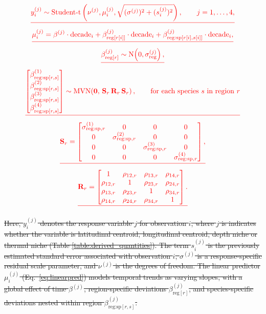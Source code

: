 \documentclass[9pt,twocolumn,twoside]{pnas-new}
\providecommand{\DIFdel}[1]{{\protect\color{red}\sout{#1}}} %
\begin{document}
{%
\begin{gather*}
\DIFdel{y_{i}^{(j)} \sim \operatorname{Student\text{-}t}
\left(\nu^{(j)}, 
\mu_{i}^{(j)}, 
\sqrt{(\sigma^{(j)})^{2} + (s^{(j)}_{i})^{2}}
\right),
\qquad j=1,\dots,4, 
}\\
\DIFdel{\mu_{i}^{(j)} =
\beta^{(j)} \cdot \text{decade}_{i}
+ \beta_{\text{reg}[r[i]]}^{(j)} \cdot \text{decade}_{i}
+ \beta_{\text{reg:sp}[r[i],s[i]]}^{(j)} \cdot \text{decade}_{i}%
,
}\\
\DIFdel{\beta_{\text{reg}[r]}^{(j)} \sim 
\operatorname{N}\!\left(0,\sigma_{\text{reg}}^{(j)}\right),
}\\
\DIFdel{\begin{bmatrix}
\beta_{\text{reg:sp}[r,s]}^{(1)} \\
\beta_{\text{reg:sp}[r,s]}^{(2)} \\
\beta_{\text{reg:sp}[r,s]}^{(3)} \\
\beta_{\text{reg:sp}[r,s]}^{(4)}
\end{bmatrix}
\sim 
\operatorname{MVN}\!\left(
\mathbf{0},\,
\mathbf{S}_{r}\,\mathbf{R}_{r}\,\mathbf{S}_{r}
\right),
\qquad \text{for each species}~s~\text{in region}~r
}\\
\DIFdel{\mathbf{S}_{r} =
\begin{bmatrix}
\sigma^{(1)}_{\text{reg:sp},r} & 0 & 0 & 0 \\
0 & \sigma^{(2)}_{\text{reg:sp},r} & 0 & 0 \\
0 & 0 & \sigma^{(3)}_{\text{reg:sp},r} & 0 \\
0 & 0 & 0 & \sigma^{(4)}_{\text{reg:sp},r}
\end{bmatrix},
}\\
\DIFdel{\mathbf{R}_{r} =
\begin{bmatrix}
1 & \rho_{12,r} & \rho_{13,r} & \rho_{14,r} \\
\rho_{12,r} & 1 & \rho_{23,r} & \rho_{24,r} \\
\rho_{13,r} & \rho_{23,r} & 1 & \rho_{34,r} \\
\rho_{14,r} & \rho_{24,r} & \rho_{34,r} & 1
\end{bmatrix}.
}\end{gather*}%

\DIFdel{Here, $y^{(j)}_i$ denotes the response variable $j$ for observation $i$, where $j$ is indicates whether the variable is latitudinal centroid,
longitudinal centroid, depth niche or thermal niche (Table \ref{table:derived_quantities}). The term $s^{(j)}_i$ is the previously estimated standard error associated with observation $i$, $\sigma^{(j)}$ is a response-specific residual scale parameter, and $\nu^{(j)}$ is the degrees of freedom. The linear predictor $\mu^{(j)}_i$ (Eq.~\ref{eq:linearpred}) models temporal trends as varying slopes, with a global effect of time $\beta^{(j)}$, region-specific deviations $\beta^{(j)}_{\text{reg}[r]}$, and species-specific deviations nested within region $\beta^{(j)}_{\text{reg:sp}[r,s]}$. 
}%

}
\end{document}
